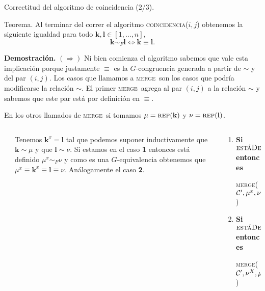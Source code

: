 \documentclass[aspectratio=169, 9pt]{beamer}
\newcommand{\rep}{\textsc{rep}}
\newcommand{\coin}{\textsc{coincidencia}}
\newcommand{\mer}{\textsc{merge}}
\newcommand{\edeff}{\textsc{estáDefinido}}
\newcommand{\Co}{{\cal{C}}}
\begin{document}
\begin{frame}[fragile]{Correctitud del algoritmo de coincidencia (2/3).}
	\begin{alertblock}{Teorema.}
		Al terminar del correr el algoritmo \coin($i, j$) obtenemos la siguiente igualdad para todo $\textbf{k}, \textbf{l} \in [1,\dots,n]$,
		\begin{equation*}
			\textbf{k} \sim_F \textbf{l} \iff \textbf{k} \equiv \textbf{l}.
		\end{equation*}
	\end{alertblock}
	\pause 
	
	\textbf{Demostración.} $(\Rightarrow)$
	\pause
	Ni bien comienza el algoritmo sabemos que vale esta implicación porque justamente $\equiv$ es la $G$-congruencia generada a partir de $\sim$ y del par $(i, j)$.
	\pause
	Los casos que llamamos a \mer \ son los casos que podría modificarse la relación $\sim$.
	El primer \mer \ agrega al par $(i, j)$ a la relación $\sim$ y sabemos que este par está por definición en $\equiv$.
	\pause
	
	
	En los otros llamados de \mer \ si tomamos $\mu = \rep(\textbf{k}) $ y $\nu = \rep(\textbf{l})$.
	\medskip
	\pause
	\begin{columns}
		\begin{column}{0.1\textwidth}
			
		\end{column}
		\begin{column}{0.6\textwidth}
			\begin{center}
				{ Tenemos $\textbf{k}^x = \textbf{l}$ tal que podemos suponer inductivamente que $\textbf{k} \sim \mu$ y que $\textbf{l} \sim \nu $.
				Si estamos en el caso \textbf{1} entonces está definido $\mu^x \sim_F \nu$ y como es una $G$-equivalencia obtenemos que $\mu^x \equiv \textbf{k}^x \equiv \textbf{l} \equiv \nu$. 
				Análogamente el caso \textbf{2}.}
			\end{center} 	
		\end{column}
		\begin{column}{0.3\textwidth}
			{\small \begin{enumerate}
				\item  \textbf{Si} $\edeff(\Co', \mu, x)$ \textbf{entonces}
				
				\mer($\Co', \mu^x, \nu, q$) 
				\item  \textbf{Si} $\edeff(\Co', \nu, X)$  \textbf{entonces}
				
				\mer($\Co', \nu^X, \mu, q$)
			\end{enumerate}}
		\end{column}
	\end{columns}
\end{frame}
\end{document}
